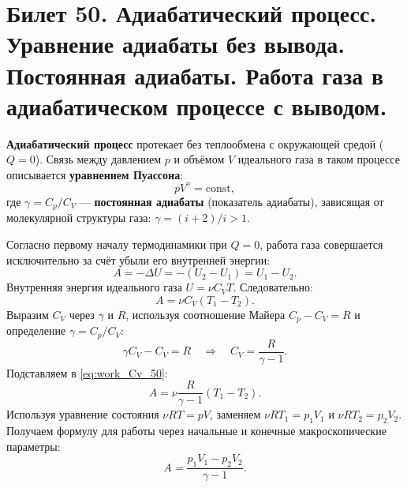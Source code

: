 \section{Билет 50. Адиабатический процесс. Уравнение адиабаты без вывода. Постоянная адиабаты. Работа газа в адиабатическом процессе с выводом.}

\begin{definition}
\textbf{Адиабатический процесс} протекает без теплообмена с окружающей средой ($Q = 0$). Связь между давлением $p$ и объёмом $V$ идеального газа в таком процессе описывается \textbf{уравнением Пуассона}:
\begin{equation}
    p V^\gamma = \text{const}, \label{eq:poisson_50}
\end{equation}
где $\gamma = C_p/C_V$ --- \textbf{постоянная адиабаты} (показатель адиабаты), зависящая от молекулярной структуры газа: $\gamma = (i+2)/i > 1$.
\end{definition}

\begin{theorem}
Согласно первому началу термодинамики при $Q=0$, работа газа совершается исключительно за счёт убыли его внутренней энергии:
\begin{equation}
    A = -\Delta U = -(U_2 - U_1) = U_1 - U_2. \label{eq:work_energy_50}
\end{equation}
Внутренняя энергия идеального газа $U = \nu C_V T$. Следовательно:
\begin{equation}
    A = \nu C_V (T_1 - T_2). \label{eq:work_Cv_50}
\end{equation}
Выразим $C_V$ через $\gamma$ и $R$, используя соотношение Майера $C_p - C_V = R$ и определение $\gamma = C_p/C_V$:
\begin{equation}
    \gamma C_V - C_V = R \quad \Rightarrow \quad C_V = \frac{R}{\gamma - 1}.
\end{equation}
Подставляем в \eqref{eq:work_Cv_50}:
\begin{equation}
    A = \nu \frac{R}{\gamma - 1} (T_1 - T_2). \label{eq:work_T_50}
\end{equation}
Используя уравнение состояния $\nu R T = p V$, заменяем $\nu R T_1 = p_1 V_1$ и $\nu R T_2 = p_2 V_2$. Получаем формулу для работы через начальные и конечные макроскопические параметры:
\begin{equation}
    A = \frac{p_1 V_1 - p_2 V_2}{\gamma - 1}. \label{eq:work_pV_50}
\end{equation}
\end{theorem}

